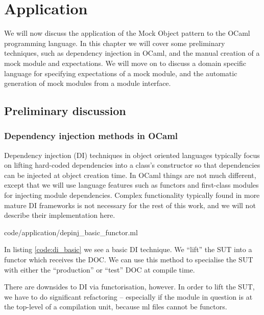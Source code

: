 \chapter{Application}
\label{application}

We will now discuss the application of the Mock Object pattern to the
OCaml programming language. In this chapter we will cover some
preliminary techniques, such as dependency injection in OCaml, and the
manual creation of a mock module and expectations. We will move on to
discuss a domain specific language for specifying expectations of a
mock module, and the automatic generation of mock modules from a
module interface.

\section{Preliminary discussion}

\subsection{Dependency injection methods in OCaml}
\label{application:di}

Dependency injection (DI) techniques in object oriented languages
typically focus on lifting hard-coded dependencies into a class's
constructor so that dependencies can be injected at object creation
time. In OCaml things are not much different, except that we will use
language features such as functors and first-class modules for
injecting module dependencies. Complex functionality typically found
in more mature DI frameworks is not necessary for the rest of this
work, and we will not describe their implementation here.


 {code/application/depinj_basic_functor.ml}

In listing \ref{code:di_basic} we see a basic DI technique. We
``lift'' the SUT into a functor which receives the DOC. We can use
this method to specialise the SUT with either the ``production'' or
``test'' DOC at compile time.

There are downsides to DI via functorisation, however. In order to
lift the SUT, we have to do significant refactoring -- especially if
the module in question is at the top-level of a compilation unit,
because ml files cannot be functors.

